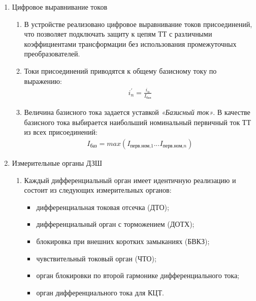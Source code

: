 \begin{enumerate}
\item Цифровое выравнивание токов

\begin{enumerate}

\item
В устройстве реализовано цифровое выравнивание токов присоединений, что позволяет подключать защиту к цепям ТТ с различными коэффициентами трансформации без использования промежуточных преобразователей.

\item
Токи присоединений приводятся к общему базисному току по выражению:
\begin{align}
i_n^{'}=\frac{i_n}{I_\textit{баз}}
\end{align}

\item
Величина базисного тока задается уставкой \textit{«Базисный ток»}. В качестве базисного тока выбирается наибольший номинальный первичный ток ТТ из всех присоединений:
\begin{align}
I_\textit{баз}=max(I_\textit{перв.ном,1}...I_\textit{перв.ном,n})
\end{align}

\end{enumerate}


\item Измерительные органы ДЗШ

\begin{enumerate}[label=\arabic{section}.\arabic{subsection}.\arabic{enumi}.\arabic*, labelsep=4pt, leftmargin=0em, itemindent=65pt, parsep=0pt]

\item
Каждый дифференциальный орган имеет идентичную реализацию и состоит из следующих измерительных органов:
\begin{itemize} 
\item дифференциальная токовая отсечка (ДТО);
\item дифференциальный орган с торможением (ДОТХ);
\item блокировка при внешних коротких замыканиях (БВКЗ);
\item чувствительный токовый орган (ЧТО);
\item орган блокировки по второй гармонике дифференциального тока;
\item орган дифференциального тока для КЦТ.
\end{itemize}


\end{enumerate}
\end{enumerate}
